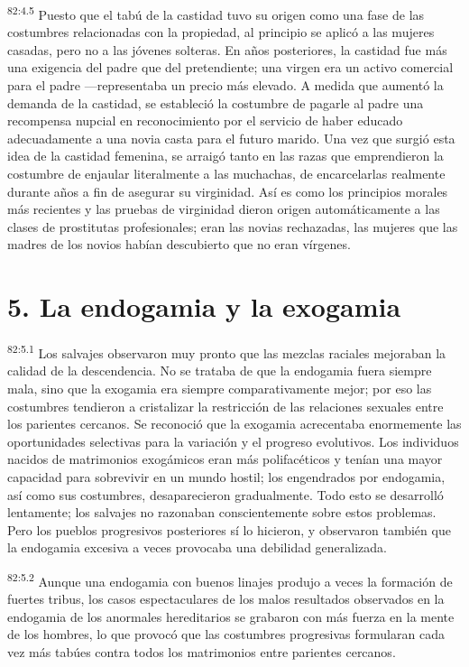 \documentclass[twoside, 11pt]{book}
\begin{document}
\par
\textsuperscript{82:4.5} Puesto que el tabú de la castidad tuvo su origen como una fase de las costumbres relacionadas con la propiedad, al principio se aplicó a las mujeres casadas, pero no a las jóvenes solteras. En años posteriores, la castidad fue más una exigencia del padre que del pretendiente; una virgen era un activo comercial para el padre ---representaba un precio más elevado. A medida que aumentó la demanda de la castidad, se estableció la costumbre de pagarle al padre una recompensa nupcial en reconocimiento por el servicio de haber educado adecuadamente a una novia casta para el futuro marido. Una vez que surgió esta idea de la castidad femenina, se arraigó tanto en las razas que emprendieron la costumbre de enjaular literalmente a las muchachas, de encarcelarlas realmente durante años a fin de asegurar su virginidad. Así es como los principios morales más recientes y las pruebas de virginidad dieron origen automáticamente a las clases de prostitutas profesionales; eran las novias rechazadas, las mujeres que las madres de los novios habían descubierto que no eran vírgenes.

\section*{5. La endogamia y la exogamia}
\par
\textsuperscript{82:5.1} Los salvajes observaron muy pronto que las mezclas raciales mejoraban la calidad de la descendencia. No se trataba de que la endogamia fuera siempre mala, sino que la exogamia era siempre comparativamente mejor; por eso las costumbres tendieron a cristalizar la restricción de las relaciones sexuales entre los parientes cercanos. Se reconoció que la exogamia acrecentaba enormemente las oportunidades selectivas para la variación y el progreso evolutivos. Los individuos nacidos de matrimonios exogámicos eran más polifacéticos y tenían una mayor capacidad para sobrevivir en un mundo hostil; los engendrados por endogamia, así como sus costumbres, desaparecieron gradualmente. Todo esto se desarrolló lentamente; los salvajes no razonaban conscientemente sobre estos problemas. Pero los pueblos progresivos posteriores sí lo hicieron, y observaron también que la endogamia excesiva a veces provocaba una debilidad generalizada.

\par
\textsuperscript{82:5.2} Aunque una endogamia con buenos linajes produjo a veces la formación de fuertes tribus, los casos espectaculares de los malos resultados observados en la endogamia de los anormales hereditarios se grabaron con más fuerza en la mente de los hombres, lo que provocó que las costumbres progresivas formularan cada vez más tabúes contra todos los matrimonios entre parientes cercanos.
\end{document}
